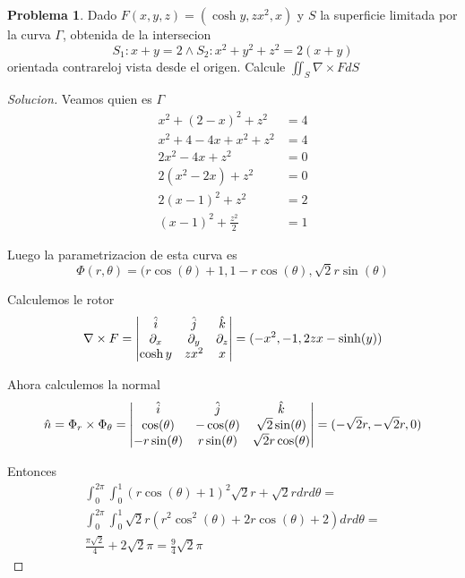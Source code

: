 \documentclass{article}
\theoremstyle{definition}
\newtheorem{problem}{Problema}
\newenvironment{solution}{\begin{proof}[Solucion]}{\end{proof}}
\begin{document}
\begin{problem}
  Dado $F(x, y, z) = (\cosh y, zx^{2}, x)$ y $S$ la superficie limitada por la curva $\Gamma$, obtenida de la intersecion
  \begin{equation*}
    S_{1}: x + y = 2 \land S_{2}: x^{2} + y^{2} + z^{2} = 2(x + y)
  \end{equation*}
  orientada contrareloj vista desde el origen. Calcule $\iint_{S} \nabla \times F dS$
\end{problem}
\begin{solution}
  Veamos quien es $\Gamma$
  \begin{align*}
    x^{2} + (2 - x)^{2} + z^{2} &= 4\\
    x^{2} + 4 - 4x + x^{2} + z^{2} &= 4\\
    2x^{2} - 4x + z^{2} &= 0\\
    2(x^{2} - 2x) + z^{2} &= 0\\
    2(x - 1)^{2} + z^{2} &= 2\\
    (x - 1)^{2} + \frac{z^{2}}{2} &= 1
  \end{align*}

  Luego la parametrizacion de esta curva es
  \begin{equation*}
    \Phi(r, \theta) = (r \cos(\theta) + 1, 1 - r \cos(\theta), \sqrt{2}r \sin(\theta)
  \end{equation*}

  Calculemos le rotor
  \begin{equation*}
    \nabla \times F = \begin{vmatrix} \hat{i} & \hat{j} & \hat{k}\\ \partial_x & \partial_y & \partial_z\\ \cosh y & zx^{2} & x\end{vmatrix} = (-x^{2}, -1, 2zx - \sinh(y))
  \end{equation*}

  Ahora calculemos la normal
  \begin{equation*}
    \hat{n} = \Phi_{r} \times \Phi_{\theta} = \begin{vmatrix} \hat{i} & \hat{j} & \hat{k}\\ \cos(\theta) & -\cos(\theta) & \sqrt{2}\sin(\theta)\\ -r \sin(\theta) & r \sin(\theta) & \sqrt{2}r \cos(\theta)\end{vmatrix} = (-\sqrt{2} r, -\sqrt{2} r, 0)
  \end{equation*}

  Entonces
  \begin{gather*}
    \int_{0}^{2\pi}\int_{0}^{1} (r \cos(\theta) + 1)^{2}\sqrt{2}r + \sqrt{2}r dr d\theta =\\
    \int_{0}^{2\pi}\int_{0}^{1} \sqrt{2}r (r^{2} \cos^{2}(\theta) + 2r \cos(\theta) + 2) dr d \theta =\\
    \frac{\pi \sqrt{2}}{4} + 2\sqrt{2} \pi = \frac{9}{4} \sqrt{2} \pi
  \end{gather*}

\end{solution}
\end{document}
